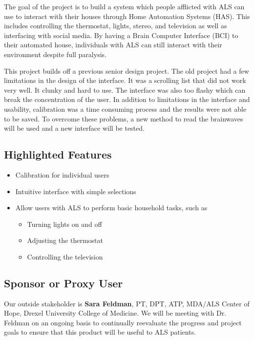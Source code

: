 \documentclass{report}
\begin{document}
The goal of the project is to build a system which people afflicted with ALS
can use to interact with their houses through Home Automation Systems (HAS).
This includes controlling the thermostat, lights, stereo, and television as
well as interfacing with social media. By having a Brain Computer Interface
(BCI) to their automated house, individuals with ALS can still interact with
their environment despite full paralysis.

This project builds off a previous senior design project. The old project had a few limitations in the design of the interface. It was a scrolling list that did not work very well. It clunky and hard to use. The interface was also too flashy which can break the concentration of the user. In addition to limitations in the interface and usability, calibration was a time consuming process and the results were not able to be saved. To overcome these problems, a new method to read the brainwaves will be used and a new interface will be tested. 

\subsection*{Highlighted Features}

\begin{itemize}
\item Calibration for individual users
\item Intuitive interface with simple selections
\item Allow users with ALS to perform basic household tasks, such as
    \begin{itemize}
        \item Turning lights on and off
        \item Adjusting the thermostat
        \item Controlling the television
    \end{itemize}
\end{itemize}

\subsection*{Sponsor or Proxy User}

Our outside stakeholder is \textbf{Sara Feldman}, PT, DPT, ATP, MDA/ALS Center
of Hope, Drexel University College of Medicine. We will be meeting with Dr.
Feldman on an ongoing basis to continually reevaluate the progress and
project goals to ensure that this product will be useful to ALS patients.
\end{document}
